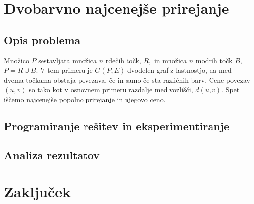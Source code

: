 \documentclass[a4paper, 11pt]{article}
\begin{document}
\section{Dvobarvno najcenejše prirejanje}
\subsection{Opis problema}
Množico $P$ sestavljata množica $n$ rdečih točk, $R,$ in množica $n$ modrih točk $B,$ $P=R \cup B.$
V tem primeru je $G(P,E)$ dvodelen graf z lastnostjo, da med dvema točkama obstaja povezava, če in samo če sta različnih barv.
Cene povezav $(u,v)$ so tako kot v osnovnem primeru razdalje med vozlišči, $d(u,v).$
Spet iščemo najcenejše popolno prirejanje in njegovo ceno.

\subsection{Programiranje rešitev in eksperimentiranje}

\subsection{Analiza rezultatov}


\section{Zaključek}

\end{document}
